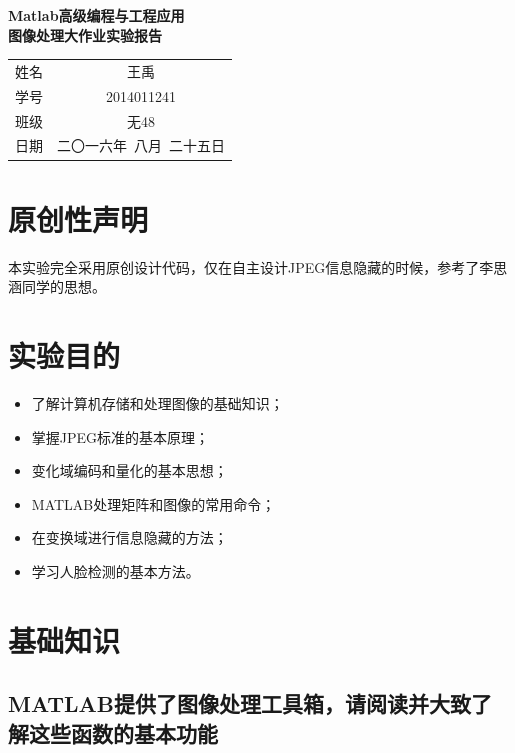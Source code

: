 \documentclass[a4paper]{article}
\newcommand{\HUGE}{\fontsize{29pt}{29pt}\selectfont}
\begin{document}
	\begin{titlepage}
		\phantom{Start!}
		\vspace{5cm}
		\begin{center}
			{ \HUGE \bfseries  Matlab高级编程与工程应用}\\[0.4cm]
			{ \HUGE \bfseries  图像处理大作业实验报告}\\[0.4cm]
		\end{center}
		\begin{flushright}
			\vfill
			{
				\newcommand{\pillar}{ {\Huge \phantom{A}} }
				\large
				\begin{tabular}{lc}
					\pillar 姓名 & 王禹 \\
					\pillar 学号 & 2014011241\\
					\pillar 班级 & 无48\\
					\pillar 日期 & 二〇一六年\ 八月\ 二十五日 \\
				\end{tabular}
			}
		\end{flushright}
	\end{titlepage}
	\renewcommand{\contentsname}{目录}
	\tableofcontents
	\newpage
	\section{原创性声明}
	本实验完全采用原创设计代码，仅在自主设计JPEG信息隐藏的时候，参考了李思涵同学的思想。
	\section{实验目的}
	\begin{itemize}
		\item 了解计算机存储和处理图像的基础知识；
		\item 掌握JPEG标准的基本原理；
		\item 变化域编码和量化的基本思想；
		\item MATLAB处理矩阵和图像的常用命令；
		\item 在变换域进行信息隐藏的方法；
		\item 学习人脸检测的基本方法。
	\end{itemize}
	
	\section{基础知识}
	\subsection{MATLAB提供了图像处理工具箱，请阅读并大致了解这些函数的基本功能}
\end{document}
